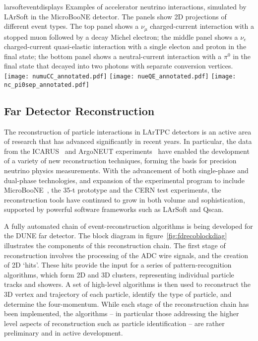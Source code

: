 \begin{cdrfigure}{larsofteventdisplays}
{Examples of accelerator neutrino interactions, simulated by LArSoft in the 
MicroBooNE detector. The panels show 2D projections of different event types.
The top panel shows a $\nu_{\mu}$ charged-current interaction with a stopped muon followed
by a decay Michel electron; the middle panel shows a $\nu_{e}$ charged-current 
quasi-elastic interaction with a single electon and proton in the final state;
the bottom panel shows a neutral-current interaction with a $\pi^{0}$ in the final state
that decayed into two photons with separate conversion vertices.}
\texttt{[image: numuCC\_annotated.pdf]}
\texttt{[image: nueQE\_annotated.pdf]}
\texttt{[image: nc\_pi0sep\_annotated.pdf]}
\end{cdrfigure}

\subsection{Far Detector Reconstruction}
\label{sec:detectors-sc-physics-software-reconstruction-fd}

The reconstruction of particle interactions in LArTPC
detectors is an active area of research that has advanced significantly in recent years.
In particular, the data from the ICARUS~\cite{Amerio:2004ze,icarus-url,ICARUS-pizero,Antonello:2012hu} 
and ArgoNEUT experiments~\cite{Adamson:2013/02/28tla,argoneut-url,Acciarri:2013met}
have enabled the development of a variety of new reconstruction techniques,
forming the basis for precision neutrino physics measurements.
With the advancement of both single-phase and dual-phase technologies,
and expansion of the experimental program to include MicroBooNE~\cite{Chen:2007ae,microboone-url},
the 35-t prototype and the CERN test experiments,
the reconstruction tools have continued to grow in both volume and sophistication,
supported by powerful software frameworks such as LArSoft and Qscan.


A fully automated chain of event-reconstruction algorithms
is being developed for the DUNE far detector.
The block diagram in figure~\ref{fig:fdrecoblockdiag} illustrates 
the components of this reconstruction chain.
The first stage of reconstruction involves the processing of the
ADC wire signals, and the creation of 2D `hits'. 
These hits provide the input for a series of pattern-recognition algorithms,
which form 2D and 3D clusters, representing individual particle tracks and showers.
A set of high-level algorithms is then used to reconstruct the 
3D vertex and trajectory of each particle, identify the type of particle,
and determine the four-momentum.
While each stage of the reconstruction chain has been implemented, the algorithms -- in
particular those addressing the higher level aspects of reconstruction such as particle identification -- are
rather preliminary and in active development.

